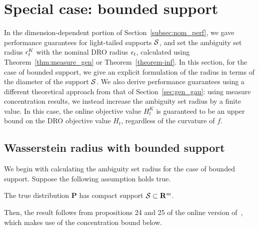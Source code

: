 \section{Special case: bounded support}
\label{sec:bounded_perf}
In the dimension-dependent portion of Section~\ref{subsec:nom_perf}, we gave performance guarantees for light-tailed supports $\mathcal{S}$, and set the ambiguity set radius $\epsilon^K_t$ with the nominal \gls{DRO} radius $\epsilon_t$, calculated using Theorem~\ref{thm:measure_gen} or Theorem~\ref{theorem-inf}. 
In this section, for the case of bounded support, we give an explicit formulation of the radius in terms of the diameter of the support $\mathcal{S}$.
We also derive performance guarantees using a different theoretical approach from that of Section~\ref{sec:gen_gau}: using measure concentration results, we instead increase the ambiguity set radius by a finite value. In this case, the online objective value $H^K_t$ is guaranteed to be an upper bound on the \gls{DRO} objective value $H_t$, regardless of the curvature of $f$.



\subsection{Wasserstein radius with bounded support}
\label{sec:static_set}
We begin with calculating the ambiguity set radius for the case of bounded support. 
Suppose the following assumption holds true.
\begin{assumption}\label{ass:noise}
The true distribution $\mathbf{P}$ has compact support $\mathcal{S} \subset \mathbf{R}^m$.
\end{assumption}
Then, the result follows from propositions 24 and 25 of the online version of~\cite{bounded_wass}, which makes use of the concentration bound below. 


